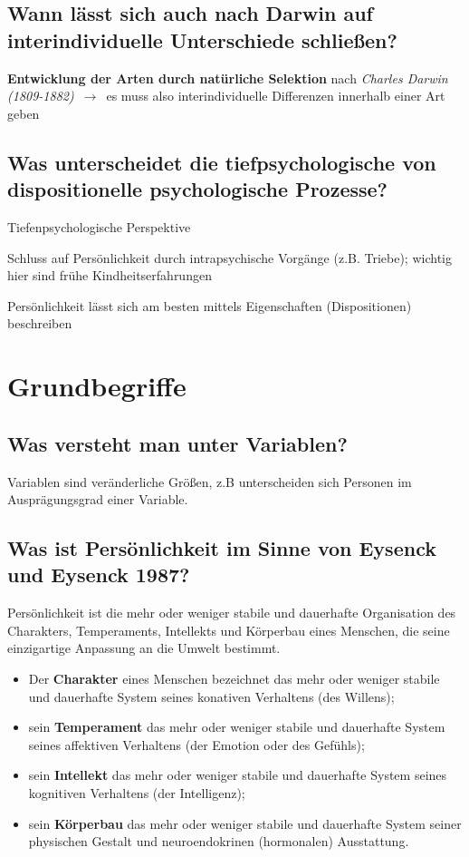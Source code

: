 \documentclass[a6paper,10pt,DIV=40]{scrartcl}
\begin{document}
\subsection{Wann lässt sich auch nach Darwin auf interindividuelle Unterschiede schließen?} 
    \textbf{Entwicklung der Arten durch natürliche Selektion} nach \textit{Charles Darwin (1809-1882)} $\,\to\,$ es muss also interindividuelle Differenzen innerhalb einer Art geben
\subsection{Was unterscheidet die tiefpsychologische von dispositionelle psychologische Prozesse?}
    \begin{labeling}{Tiefenpsychologische Perspektive}
    \item [Tiefenpsychologische Perspektive] Schluss auf Persönlichkeit durch intrapsychische Vorgänge (z.B. Triebe); wichtig hier sind frühe Kindheitserfahrungen
    \item [Dispositionelle Perspektive] Persönlichkeit lässt sich am besten mittels Eigenschaften (Dispositionen) beschreiben
    \end{labeling}



\section{Grundbegriffe}

\subsection{Was versteht man unter Variablen?}
    Variablen sind veränderliche Größen, z.B unterscheiden sich Personen im Ausprägungsgrad einer Variable.
\subsection{Was ist Persönlichkeit im Sinne von Eysenck und Eysenck 1987?}
    Persönlichkeit ist die mehr oder weniger stabile und dauerhafte Organisation des Charakters, Temperaments, Intellekts und Körperbau eines Menschen, die seine einzigartige Anpassung an die Umwelt bestimmt.
    \begin{itemize}\itemsep-0.5ex
        \item Der \textbf{Charakter} eines Menschen bezeichnet das mehr oder weniger stabile und dauerhafte System seines konativen Verhaltens (des Willens);
        \item sein \textbf{Temperament} das mehr oder weniger stabile und dauerhafte System seines affektiven Verhaltens (der Emotion oder des Gefühls);
        \item sein \textbf{Intellekt} das mehr oder weniger stabile und dauerhafte System seines kognitiven Verhaltens (der Intelligenz);
        \item sein \textbf{Körperbau} das mehr oder weniger stabile und dauerhafte System seiner physischen Gestalt und neuroendokrinen (hormonalen) Ausstattung.
    \end{itemize}
\end{document}
